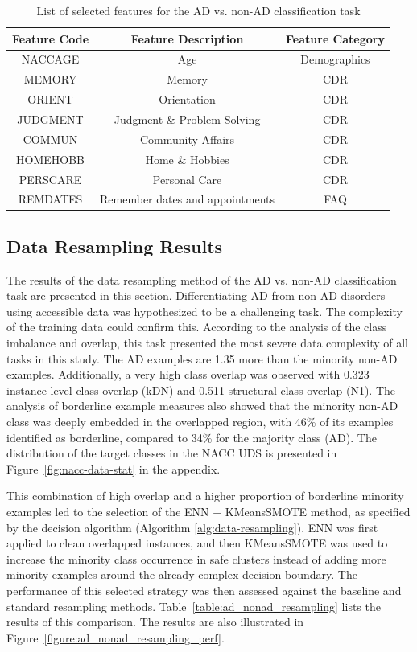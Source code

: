 \begin{table}[h!]
\centering
\caption{List of selected features for the AD vs. non-AD classification task}
\label{table:features-task5}
\begin{tabular}{ccc}
\toprule
\textbf{Feature Code} & \textbf{Feature Description} & \textbf{Feature Category} \\
\midrule
NACCAGE & Age & Demographics \\
MEMORY & Memory & CDR \\
ORIENT & Orientation & CDR \\
JUDGMENT & Judgment \& Problem Solving & CDR \\
COMMUN & Community Affairs & CDR \\
HOMEHOBB & Home \& Hobbies & CDR \\
PERSCARE & Personal Care & CDR \\
REMDATES & Remember dates and appointments & FAQ \\
\bottomrule
\end{tabular}
\end{table}

\subsection{Data Resampling Results}
\label{sec:resampling_results_ro3}
The results of the data resampling method of the AD vs. non-AD classification task are presented in this section. Differentiating AD from non-AD disorders using accessible data was hypothesized to be a challenging task. The complexity of the training data could confirm this. According to the analysis of the class imbalance and overlap, this task presented the most severe data complexity of all tasks in this study. The AD examples are 1.35 more than the minority non-AD examples. Additionally, a very high class overlap was observed with 0.323 instance-level class overlap (kDN) and 0.511 structural class overlap (N1). The analysis of borderline example measures also showed that the minority non-AD class was deeply embedded in the overlapped region, with 46\% of its examples identified as borderline, compared to 34\% for the majority class (AD). The distribution of the target classes in the NACC UDS is presented in Figure~\ref{fig:nacc-data-stat} in the appendix.

This combination of high overlap and a higher proportion of borderline minority examples led to the selection of the ENN + KMeansSMOTE method, as specified by the decision algorithm (Algorithm \ref{alg:data-resampling}). ENN was first applied to clean overlapped instances, and then KMeansSMOTE was used to increase the minority class occurrence in safe clusters instead of adding more minority examples around the already complex decision boundary. The performance of this selected strategy was then assessed against the baseline and standard resampling methods. Table~\ref{table:ad_nonad_resampling} lists the results of this comparison. The results are also illustrated in Figure~\ref{figure:ad_nonad_resampling_perf}.


